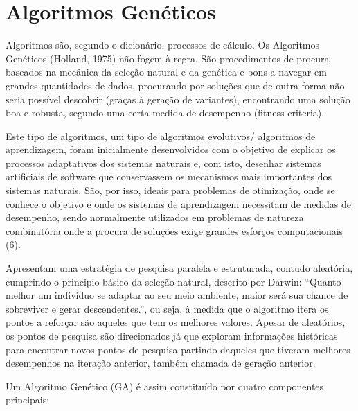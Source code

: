 \section{Algoritmos Genéticos}\label{sec:GenericAlgorithms}

Algoritmos são, segundo o dicionário, processos de cálculo. Os Algoritmos Genéticos (Holland, 1975) não fogem à regra. São procedimentos de procura baseados na mecânica da seleção natural e da genética e bons a navegar em grandes quantidades de dados, procurando por soluções que de outra forma não seria possível descobrir (graças à geração de variantes), encontrando uma solução boa e robusta, segundo uma certa medida de desempenho (fitness criteria).

Este tipo de algoritmos, um tipo de algoritmos evolutivos/ algoritmos de aprendizagem, foram inicialmente desenvolvidos com o objetivo de explicar os processos adaptativos dos sistemas naturais e, com isto, desenhar sistemas artificiais de software que conservassem os mecanismos mais importantes dos sistemas naturais. São, por isso, ideais para problemas de otimização, onde se conhece o objetivo e onde os sistemas de aprendizagem necessitam de medidas de desempenho, sendo normalmente utilizados em problemas de natureza combinatória onde a procura de soluções exige grandes esforços computacionais (6).

Apresentam uma estratégia de pesquisa paralela e estruturada, contudo aleatória, cumprindo o principio básico da seleção natural, descrito por Darwin: “Quanto melhor um indivíduo se adaptar ao seu meio ambiente, maior será sua chance de sobreviver e gerar descendentes.”, ou seja, à medida que o algoritmo itera os pontos a reforçar são aqueles que tem os melhores valores. Apesar de aleatórios, os pontos de pesquisa são direcionados já que exploram informações históricas para encontrar novos pontos de pesquisa partindo daqueles que tiveram melhores desempenhos na iteração anterior, também chamada de geração anterior.

Um Algoritmo Genético (GA) é assim constituído por quatro componentes principais:

